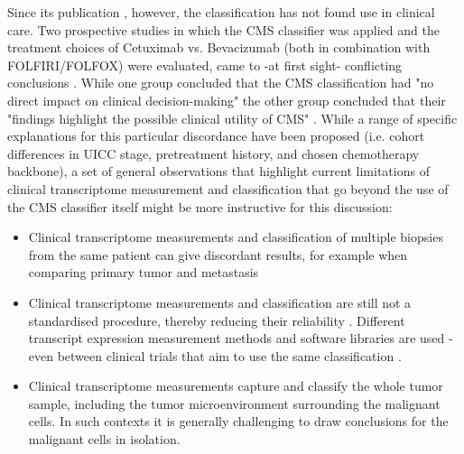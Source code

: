 \begin{flushleft}
Since its publication \parencite{guinneyConsensusMolecularSubtypes2015}, however, the classification has not found use in clinical care. Two prospective studies in which the CMS classifier was applied and the treatment choices of Cetuximab vs. Bevacizumab (both in combination with FOLFIRI/FOLFOX) were evaluated, came to -at first sight- conflicting conclusions \parencite{stintzingConsensusMolecularSubgroups2019, lenzImpactConsensusMolecular2019, aderkaExplainingUnexplainableDiscrepancies2019, sveenPredictiveModelingColorectal2019}. While one group concluded that the CMS classification had "no direct impact on clinical decision-making" \parencite{stintzingConsensusMolecularSubgroups2019,} the other group concluded that their "findings highlight the possible clinical utility of CMS" \parencite{lenzImpactConsensusMolecular2019}. While a range of specific explanations for this particular discordance have been proposed (i.e. cohort differences in UICC stage, pretreatment history, and chosen chemotherapy backbone), a set of general observations that highlight current limitations of clinical transcriptome measurement and classification that go beyond the use of the CMS classifier itself might be more instructive for this discussion: 

\begin{itemize} 
    \item Clinical transcriptome measurements and classification of multiple biopsies from the same patient can give discordant results, for example when comparing primary tumor and metastasis \parencite{eideMetastaticHeterogeneityConsensus2021}  
    \item Clinical transcriptome measurements and classification are still not a standardised procedure, thereby reducing their reliability \parencite{sveenPredictiveModelingColorectal2019}. Different transcript expression measurement methods and software libraries are used - even between clinical trials that aim to use the same classification \parencite{stintzingConsensusMolecularSubgroups2019, lenzImpactConsensusMolecular2019}.
    \item Clinical transcriptome measurements capture and classify the whole tumor sample, including the tumor microenvironment surrounding the malignant cells. In such contexts it is generally challenging to draw conclusions for the malignant cells in isolation.
\end{itemize}


\end{flushleft}
